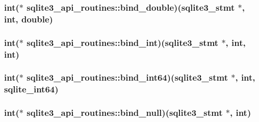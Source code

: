 \hypertarget{structsqlite3__api__routines_aca43a229ce28397ba8c18a4d6e03e40c}{
\subsubsection[{bind\-\_\-double}]{\setlength{\rightskip}{0pt plus 5cm}int($\ast$ sqlite3\-\_\-api\-\_\-routines\-::bind\-\_\-double)({\bf sqlite3\-\_\-stmt} $\ast$, int, double)}}\label{structsqlite3__api__routines_aca43a229ce28397ba8c18a4d6e03e40c}
\hypertarget{structsqlite3__api__routines_a6fef49e6c9c1fa573c55cc6668a8448f}{
\subsubsection[{bind\-\_\-int}]{\setlength{\rightskip}{0pt plus 5cm}int($\ast$ sqlite3\-\_\-api\-\_\-routines\-::bind\-\_\-int)({\bf sqlite3\-\_\-stmt} $\ast$, int, int)}}\label{structsqlite3__api__routines_a6fef49e6c9c1fa573c55cc6668a8448f}
\hypertarget{structsqlite3__api__routines_a489304cada65abca390da9b751da8800}{
\subsubsection[{bind\-\_\-int64}]{\setlength{\rightskip}{0pt plus 5cm}int($\ast$ sqlite3\-\_\-api\-\_\-routines\-::bind\-\_\-int64)({\bf sqlite3\-\_\-stmt} $\ast$, int, {\bf sqlite\-\_\-int64})}}\label{structsqlite3__api__routines_a489304cada65abca390da9b751da8800}
\hypertarget{structsqlite3__api__routines_a74d16d0bb57db37d654e95fb7e72c93c}{
\subsubsection[{bind\-\_\-null}]{\setlength{\rightskip}{0pt plus 5cm}int($\ast$ sqlite3\-\_\-api\-\_\-routines\-::bind\-\_\-null)({\bf sqlite3\-\_\-stmt} $\ast$, int)}}\label{structsqlite3__api__routines_a74d16d0bb57db37d654e95fb7e72c93c}
